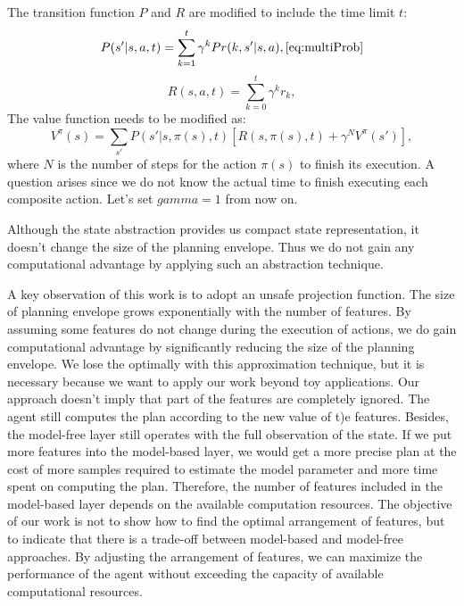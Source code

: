 The transition function $P$ and $R$ are modified to include the time limit $t$:
\begin{equation}
    P(s'|s, a, t) = \sum^t_{k=1} \gamma^k Pr(k, s'|s, a),
    \ref{eq:multiProb}
\end{equation}
\begin{equation}
    R(s, a, t) = \sum^t_{k=0} \gamma^k r_k,
\end{equation}
The value function needs to be modified as:
\begin{equation}
    V^{\pi}(s) = \sum_{s'}P(s'|s, \pi(s), t)[R(s, \pi(s), t) + \gamma^N V^{\pi}(s')],
\end{equation}
where $N$ is the number of steps for the action $\pi(s)$ to finish its execution.
A question arises since we do not know the actual time to finish executing each composite action.
Let's set $gamma=1$ from now on.

Although the state abstraction provides us compact state representation, 
it doesn't change the size of the planning envelope. Thus we do not gain any computational
advantage by applying such an abstraction technique.

A key observation of this work is to adopt an unsafe projection function. 
The size of planning envelope grows exponentially with the number of features.
By assuming 
some features do not change during the execution of actions, we do gain computational advantage by
significantly reducing the size of the planning envelope. 
We lose the optimally with this approximation technique, but it is necessary because we want 
to apply our work beyond toy applications.
Our approach doesn't imply that
part of the features are completely ignored. The agent still computes the plan according to 
the new value of t)e features.
Besides, the model-free layer still operates with the full observation of the state. 
If we put more features into the model-based layer, we would get a more precise plan at the cost
of more samples required to estimate the model parameter and more time spent on computing the plan.
Therefore, the number of features included in the model-based layer depends on the available 
computation resources.
The objective of our work is not to show how to find the optimal arrangement of features, but to indicate
that there is a trade-off between model-based and model-free approaches.
By adjusting the arrangement of features, we can maximize the performance of the agent without exceeding
the capacity of available computational resources.

